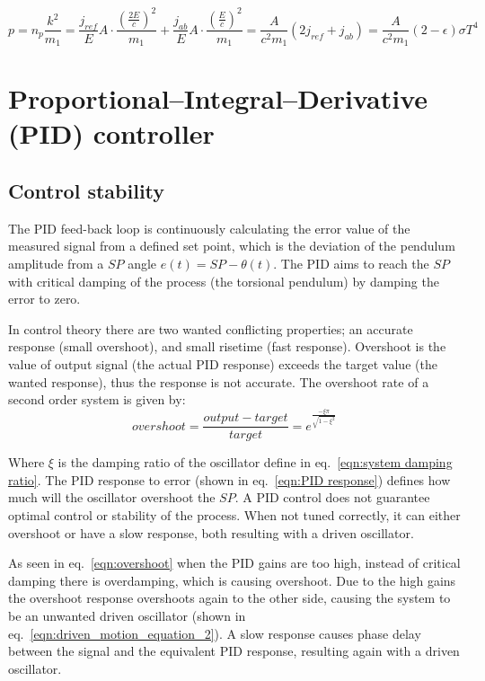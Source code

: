 \documentclass[\main/master.tex]{subfiles}
\begin{document}
\begin{equation}
p =  n_p\frac{ k^2}{m_1} = \frac{j_{ref}}{E}A\cdot\frac{ (\frac{2E}{c})^2}{m_1} +\frac{j_{ab}}{E}A\cdot\frac{ (\frac{E}{c})^2}{m_1} = \frac{A}{ c^2 m_1} (2j_{ref}+j_{ab}) =\frac{A}{ c^2 m_1} (2-\epsilon)\sigma T^4 
\label{eqn:photon collision power}
\end{equation}


\section{Proportional–Integral–Derivative (PID) controller}
\subsection{Control stability}
The PID feed-back loop is continuously calculating the error value of the measured signal from a defined set point, which is the deviation of the pendulum amplitude from a $SP$ angle $e(t) =SP -\theta(t) $. The PID aims to reach the $SP$ with critical damping of the process (the torsional pendulum) by damping the error to zero. 
\par\noindent
In control theory there are two wanted conflicting properties; an accurate response (small overshoot), and small risetime (fast response). Overshoot is the value of output signal (the actual PID response) exceeds the target value (the wanted response), thus the response is not accurate. The overshoot rate of a second order system is given by:
\begin{equation}
overshoot =  \frac{output-target}{target} = e ^{\frac{-\xi\pi}{\sqrt{1-\xi^2}}}  \label{eqn:overshoot}
\end{equation}
\par\noindent
Where $\xi$ is the damping ratio of the oscillator define in eq.~\ref{eqn:system damping ratio}. The PID response to error (shown in eq.~\ref{eqn:PID response}) defines how much will the oscillator overshoot the $SP$. A PID control does not guarantee optimal control or stability of the process. When not tuned correctly, it can either overshoot or have a slow response, both resulting with a driven oscillator.
\par\noindent
As seen in eq.~\ref{eqn:overshoot} when the PID gains are too high, instead of critical damping there is overdamping, which is causing overshoot. Due to the high gains the overshoot response overshoots again to the other side, causing the system to be an unwanted driven oscillator (shown in eq.~\ref{eqn:driven_motion_equation_2}). A slow response causes phase delay between the signal and the equivalent PID response, resulting  again with a driven oscillator.
\end{document}
